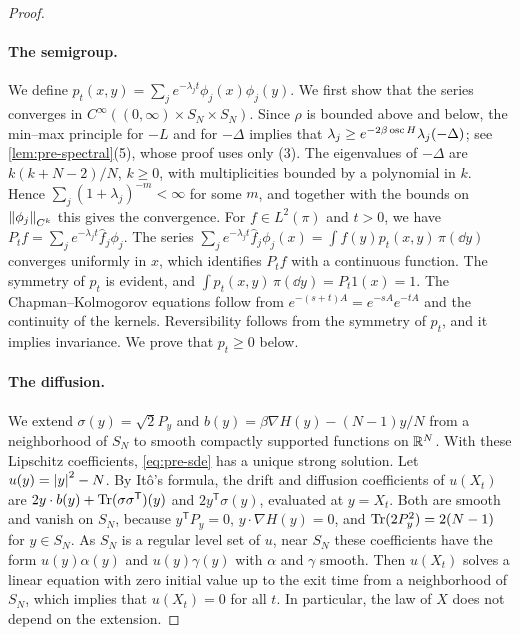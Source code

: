 \begin{proof}
\paragraph{The semigroup.} We define $p_t(x,y)=\sum_je^{-\lambda_jt}\phi_j(x)\phi_j(y)$. We first show that the series converges in $C^\infty((0,\infty)\times S_N\times S_N)$. Since $\rho$ is bounded above and below, the min--max principle for $-L$ and for $-\Delta$ implies that $\lambda_j\ge e^{-2\beta\operatorname{osc} H}\lambda_j(-\Delta)$; see \cref{lem:pre-spectral}(5), whose proof uses only (3). The eigenvalues of $-\Delta$ are $k(k+N-2)/N$, $k\ge0$, with multiplicities bounded by a polynomial in $k$. Hence $\sum_j(1+\lambda_j)^{-m}<\infty$ for some $m$, and together with the bounds on $\left\lVert\phi_j\right\rVert_{C^k}$ this gives the convergence. For $f\in L^2(\pi)$ and $t>0$, we have $P_tf=\sum_je^{-\lambda_jt}\hat f_j\phi_j$. The series $\sum_je^{-\lambda_jt}\hat f_j\phi_j(x)=\int f(y)p_t(x,y)\,\pi(\dd y)$ converges uniformly in $x$, which identifies $P_tf$ with a continuous function. The symmetry of $p_t$ is evident, and $\int p_t(x,y)\,\pi(\dd y)=P_t1(x)=1$. The Chapman--Kolmogorov equations follow from $e^{-(s+t)A}=e^{-sA}e^{-tA}$ and the continuity of the kernels. Reversibility follows from the symmetry of $p_t$, and it implies invariance. We prove that $p_t\ge0$ below.

\paragraph{The diffusion.} We extend $\sigma(y)=\sqrt2P_y$ and $b(y)=\beta\nabla H(y)-(N-1)y/N$ from a neighborhood of $S_N$ to smooth compactly supported functions on $\mathbb R^N$. With these Lipschitz coefficients, \eqref{eq:pre-sde} has a unique strong solution. Let $u(y)=\left|y\right|^2-N$. By It\^o's formula, the drift and diffusion coefficients of $u(X_t)$ are $2y\cdot b(y)+\operatorname{Tr}(\sigma\sigma^{\mathsf T})(y)$ and $2y^{\mathsf T}\sigma(y)$, evaluated at $y=X_t$. Both are smooth and vanish on $S_N$, because $y^{\mathsf T}P_y=0$, $y\cdot\nabla H(y)=0$, and $\operatorname{Tr}(2P_y^2)=2(N-1)$ for $y\in S_N$. As $S_N$ is a regular level set of $u$, near $S_N$ these coefficients have the form $u(y)\alpha(y)$ and $u(y)\gamma(y)$ with $\alpha$ and $\gamma$ smooth. Then $u(X_t)$ solves a linear equation with zero initial value up to the exit time from a neighborhood of $S_N$, which implies that $u(X_t)=0$ for all $t$. In particular, the law of $X$ does not depend on the extension.


\end{proof}
